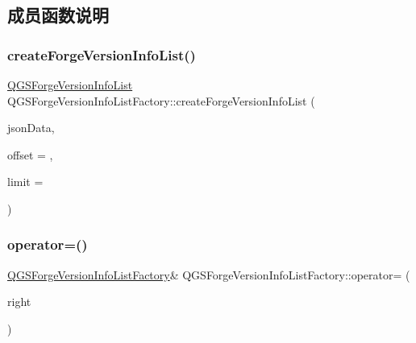\subsection{成员函数说明}
\mbox{\label{class_q_g_s_forge_version_info_list_factory_afb4cb541a5330f41838089a19a2600e0}} 
\subsubsection{\texorpdfstring{create\+Forge\+Version\+Info\+List()}{createForgeVersionInfoList()}}
{\footnotesize\ttfamily \mbox{\hyperlink{class_q_g_s_forge_version_info_list}{Q\+G\+S\+Forge\+Version\+Info\+List}} Q\+G\+S\+Forge\+Version\+Info\+List\+Factory\+::create\+Forge\+Version\+Info\+List (\begin{DoxyParamCaption}\item[{const Q\+Byte\+Array \&}]{json\+Data,  }\item[{int}]{offset = {},  }\item[{int}]{limit = {} }\end{DoxyParamCaption})}

\mbox{\label{class_q_g_s_forge_version_info_list_factory_a05913e8c40ff934dad19cbab45747005}} 
\subsubsection{\texorpdfstring{operator=()}{operator=()}\hspace{0.1cm}{\footnotesize\ttfamily [1/2]}}
{\footnotesize\ttfamily \mbox{\hyperlink{class_q_g_s_forge_version_info_list_factory}{Q\+G\+S\+Forge\+Version\+Info\+List\+Factory}}\& Q\+G\+S\+Forge\+Version\+Info\+List\+Factory\+::operator= (\begin{DoxyParamCaption}\item[{const \mbox{\hyperlink{class_q_g_s_forge_version_info_list_factory}{Q\+G\+S\+Forge\+Version\+Info\+List\+Factory}} \&}]{right }\end{DoxyParamCaption})\hspace{0.3cm}{\ttfamily [delete]}}

